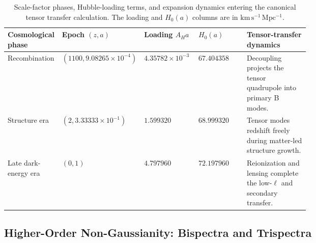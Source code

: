\documentclass[11pt,letterpaper]{article}
\theoremstyle{plain}
\newcommand{\kmsmpc}{\mathrm{km\,s^{-1}\,Mpc^{-1}}}
\newcommand{\AH}{A_H}
\begin{document}
\begin{table}[htbp]
\centering
\scriptsize
\begin{tabularx}{\linewidth}{@{}L{0.18\linewidth}L{0.17\linewidth}L{0.18\linewidth}L{0.16\linewidth}Y@{}}
\toprule
Cosmological phase & Epoch \((z,a)\) &
Loading \(\AH a\) & \(H_0(a)\) &
Tensor-transfer dynamics \\
\midrule
Recombination & \((1100,9.08265\times10^{-4})\) &
\(4.35782\times10^{-3}\) & \(67.404358\) &
Decoupling projects the tensor quadrupole into primary B modes. \\
Structure era & \((2,3.33333\times10^{-1})\) &
\(1.599320\) & \(68.999320\) &
Tensor modes redshift freely during matter-led structure growth. \\
Late dark-energy era & \((0,1)\) &
\(4.797960\) & \(72.197960\) &
Reionization and lensing complete the low-\(\ell\) and secondary transfer. \\
\bottomrule
\end{tabularx}
\caption{Scale-factor phases, Hubble-loading terms, and expansion dynamics
entering the canonical tensor transfer calculation.  The loading and
\(H_0(a)\) columns are in \(\kmsmpc\).}
\label{tab:shbt-tensor-expansion-phases}
\end{table}

\subsection{Higher-Order Non-Gaussianity: Bispectra and Trispectra}
\label{sec:shbt-higher-order-non-gaussianity}
\end{document}
